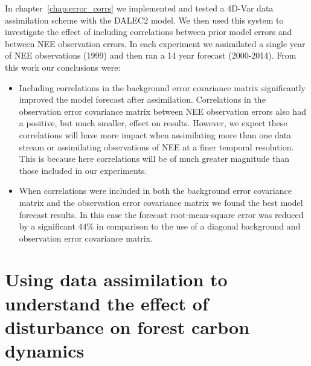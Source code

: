 In chapter~\ref{chap:error_corrs} we implemented and tested a 4D-Var data assimilation scheme with the DALEC2 model. We then used this system to investigate the effect of including correlations between prior model errors and between NEE observation errors. In each experiment we assimilated a single year of NEE observations (1999) and then ran a 14 year forecast (2000-2014). From this work our conclusions were:
\begin{itemize}
\item Including correlations in the background error covariance matrix significantly improved the model forecast after assimilation. Correlations in the observation error covariance matrix between NEE observation errors also had a positive, but much smaller, effect on results. However, we expect these correlations will have more impact when assimilating more than one data stream or assimilating observations of NEE at a finer temporal resolution. This is because here correlations will be of much greater magnitude than those included in our experiments.
\item When correlations were included in both the background error covariance matrix and the observation error covariance matrix we found the best model forecast results. In this case the forecast root-mean-square error was reduced by a significant $44\% $ in comparison to the use of a diagonal background and observation error covariance matrix.
\end{itemize} 


\section{Using data assimilation to understand the effect of disturbance on forest carbon dynamics}

